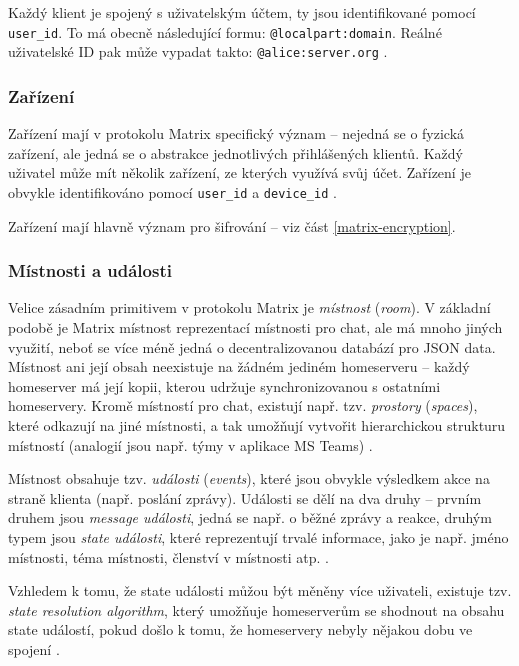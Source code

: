 Každý klient je spojený s uživatelským účtem, ty jsou identifikované pomocí
\texttt{user_id}. To má obecně následující formu:
\texttt{@localpart:domain}. Reálné uživatelské ID pak může vypadat
takto: \texttt{@alice:server.org} \parencite{MatrixORG-Spec}.

\subsubsection{Zařízení}

Zařízení mají v protokolu Matrix specifický význam -- nejedná se o fyzická
zařízení, ale jedná se o abstrakce jednotlivých přihlášených klientů. Každý
uživatel může mít několik zařízení, ze kterých využívá svůj účet. Zařízení je
obvykle identifikováno pomocí \texttt{user_id} a
\texttt{device_id} \parencite{MatrixORG-Spec}.

Zařízení mají hlavně význam pro šifrování -- viz část \ref{matrix-encryption}.

\subsubsection{Místnosti a události}

Velice zásadním primitivem v protokolu Matrix je \textit{místnost}
(\textit{room}). V základní podobě je Matrix místnost reprezentací místnosti pro
chat, ale má mnoho jiných využití, neboť se více méně jedná o decentralizovanou
databází pro JSON data. Místnost ani její obsah neexistuje na žádném jediném
homeserveru -- každý homeserver má její kopii, kterou udržuje synchronizovanou s
ostatními homeservery. Kromě místností pro chat, existují např. tzv.
\textit{prostory} (\textit{spaces}), které odkazují na jiné místnosti, a tak
umožňují vytvořit hierarchickou strukturu místností (analogií jsou např. týmy v
aplikace MS Teams) \parencite{MatrixORG-Spec}.

Místnost obsahuje tzv. \textit{události} (\textit{events}), které jsou obvykle
výsledkem akce na straně klienta (např. poslání zprávy). Události se dělí na dva
druhy -- prvním druhem jsou \textit{message události}, jedná se např. o běžné
zprávy a reakce, druhým typem jsou \textit{state události}, které reprezentují
trvalé informace, jako je např. jméno místnosti, téma místnosti, členství v
místnosti atp. \parencite{MatrixORG-Spec}.

Vzhledem k tomu, že state události můžou být měněny více uživateli, existuje
tzv. \textit{state resolution algorithm}, který umožňuje homeserverům se
shodnout na obsahu state událostí, pokud došlo k tomu, že homeservery nebyly
nějakou dobu ve spojení \parencite{MatrixORG-Spec}.


